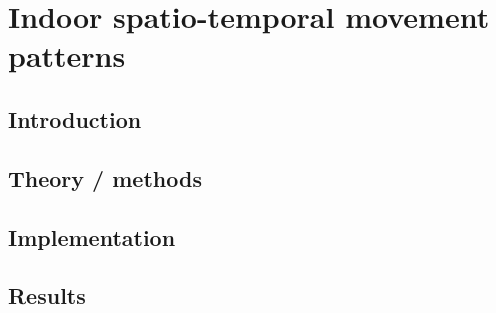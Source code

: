 \chapter{Indoor spatio-temporal movement patterns}
\section{Introduction}
\section{Theory / methods}
\section{Implementation}
\section{Results}

